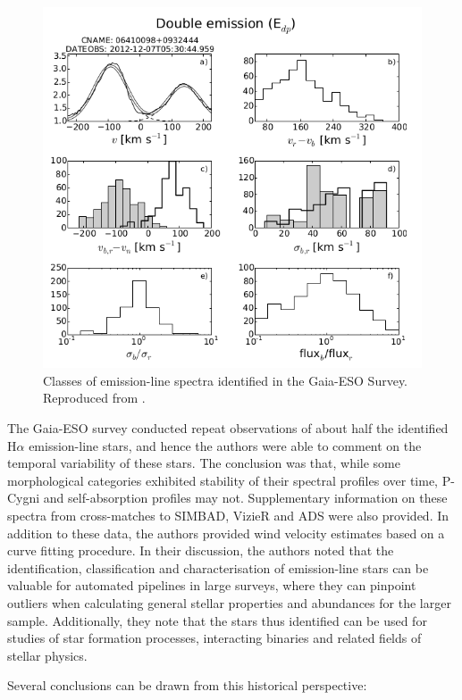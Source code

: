 \begin{figure}[!htb]
\centering
\includegraphics[scale=.85]{figures/gaia eso2.png}
\caption{Classes of emission-line spectra identified in the Gaia-ESO Survey. Reproduced from \citet{traven2015gaia}.}
\end{figure}

The Gaia-ESO survey conducted repeat observations of about half the identified H$\alpha$ emission-line stars, and hence the authors were able to comment on the temporal variability of these stars. The conclusion was that, while some morphological categories exhibited stability of their spectral profiles over time, P-Cygni and self-absorption profiles may not. Supplementary information on these spectra from cross-matches to SIMBAD, VizieR and ADS were also provided. In addition to these data, the authors  provided wind velocity estimates based on a curve fitting procedure. In their discussion, the authors noted that the identification, classification and characterisation of emission-line stars can be valuable for automated pipelines in large surveys, where they can pinpoint outliers when calculating general stellar properties and abundances for the larger sample. Additionally, they note that the stars thus identified can be used for studies of star formation processes, interacting binaries and related fields of stellar physics. 

Several conclusions can be drawn from this historical perspective: 

